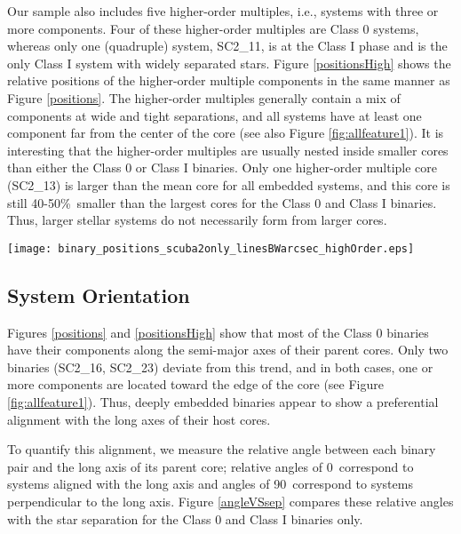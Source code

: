 \documentclass[usenatbib,a4paper]{mnras}
\begin{document}
Our sample also includes five higher-order multiples, i.e., systems with three or more components.  Four of these higher-order multiples are Class 0 systems, whereas only one (quadruple) system, SC2\_11, is at the Class I phase and is the only Class I system with widely separated stars.  Figure \ref{positionsHigh} shows the relative positions of the higher-order multiple components in the same manner as Figure \ref{positions}.  The higher-order multiples generally contain a mix of components at wide and tight separations, and all systems have at least one component far from the center of the core (see also Figure \ref{fig:allfeature1}).  It is interesting that the higher-order multiples are usually nested inside smaller cores than either the Class 0 or Class I binaries.  Only one higher-order multiple core (SC2\_13) is larger than the mean core for all embedded systems, and this core is still 40-50\%\ smaller than the largest cores for the Class 0 and Class I binaries.  Thus, larger stellar systems do not necessarily form from larger cores.

\begin{figure*}
\texttt{[image: binary\_positions\_scuba2only\_linesBWarcsec\_highOrder.eps]}
\caption{Same as Figure \ref{positions}, but for the five higher-order multiples in Perseus.  Four of these systems are at the Class 0 phase and one is at the Class I phase.  The dashed ellipses show the largest core size for the higher-order multiples.  This core size has not been deconvolved with the beam (14.6\arcsec). \label{positionsHigh}}
\end{figure*}


\subsection{System Orientation}\label{orientation}

Figures \ref{positions} and \ref{positionsHigh} show that most of the Class 0 binaries have their components along the semi-major axes of their parent cores.  Only two binaries (SC2\_16, SC2\_23) deviate from this trend, and in both cases, one or more components are located toward the edge of the core (see Figure \ref{fig:allfeature1}).  Thus, deeply embedded binaries appear to show a preferential alignment with the long axes of their host cores.  

To quantify this alignment, we measure the relative angle between each binary pair and the long axis of its parent core; relative angles of 0\degree\ correspond to systems aligned with the long axis and angles of 90\degree\ correspond to systems perpendicular to the long axis.  Figure \ref{angleVSsep} compares these relative angles with the star separation for the Class 0 and Class I binaries only.  
\end{document}
